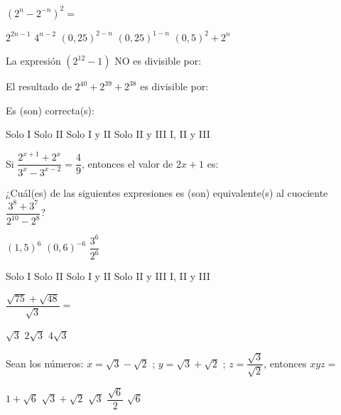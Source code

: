 \documentclass[pagina vacia]{srs}
\begin{document}
\begin{preguntas}
\pregunta \((2^n - 2^{-n})^2 =\)
\begin{vertical}
\alternativa \(2^{2n-1}\)
\alternativa \(4^{n-2}\)
\alternativa \((0,25)^{2-n}\)
\alternativa \((0,25)^{1-n}\)
\alternativa \((0,5)^2 + 2^n\)
\end{vertical}

\pregunta La expresión \((2^{12} - 1)\) NO es divisible por:
\begin{vertical}
\end{vertical}

\pregunta El resultado de \(2^{40} + 2^{39} + 2^{38}\) es divisible por:
\begin{verticali}
\end{verticali}
Es (son) correcta(s):
\begin{vertical}
\alternativa Solo I
\alternativa Solo II
\alternativa Solo I y II
\alternativa Solo II y III
\alternativa I, II y III
\end{vertical}

\pregunta Si \(\dfrac{2^{x+1} + 2^x}{3^x - 3^{x-2}} = \dfrac{4}{9}\), entonces el valor de \(2x+1\) es:
\begin{vertical}
\end{vertical}

\pregunta ¿Cuál(es) de las siguientes expresiones es (son) equivalente(s) al cuociente \(\dfrac{3^8 + 3^7}{2^{10} - 2^8}\)?
\begin{verticali}
\alternativa \((1,5)^6\)
\alternativa \((0,6)^{-6}\)
\alternativa \(\dfrac{3^6}{2^6}\)
\end{verticali}
\begin{vertical}
\alternativa Solo I
\alternativa Solo II
\alternativa Solo I y II
\alternativa Solo II y III
\alternativa I, II y III
\end{vertical}

\pregunta \(\dfrac{\sqrt{75} + \sqrt{48}}{\sqrt{3}} =\)
\begin{vertical}
\alternativa \(\sqrt{3}\)
\alternativa \(2\sqrt{3}\)
\alternativa \(4\sqrt{3}\)
\end{vertical}

\pregunta Sean los números: \(x = \sqrt{3} - \sqrt{2}\) ; \(y = \sqrt{3} + \sqrt{2}\) ; \(z = \dfrac{\sqrt{3}}{\sqrt{2}}\), entonces \(xyz =\)
\begin{vertical}
\alternativa \(1 + \sqrt{6}\)
\alternativa \(\sqrt{3} + \sqrt{2}\)
\alternativa \(\sqrt{3}\)
\alternativa \(\dfrac{\sqrt{6}}{2}\)
\alternativa \(\sqrt{6}\)
\end{vertical}


\end{preguntas}
\end{document}
